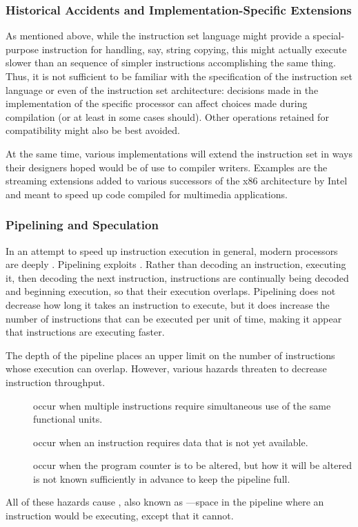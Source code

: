 \subsubsection{Historical Accidents and Implementation-Specific Extensions}
As mentioned above, while the instruction set language might provide a special-purpose instruction for handling, say, string copying, this might actually execute slower than an sequence of simpler instructions accomplishing the same thing. Thus, it is not sufficient to be familiar with the specification of the instruction set language or even of the instruction set architecture: decisions made in the implementation of the specific processor can affect choices made during compilation (or at least in some cases should). Other operations retained for compatibility might also be best avoided.

At the same time, various implementations will extend the instruction set in ways their designers hoped would be of use to compiler writers. Examples are the streaming  extensions added to various successors of the x86 architecture by Intel and  meant to speed up code compiled for multimedia applications.

\subsubsection{Pipelining and Speculation}
In an attempt to speed up instruction execution in general, modern processors are deeply . Pipelining exploits . Rather than decoding an instruction, executing it, then decoding the next instruction, instructions are continually being decoded and beginning execution, so that their execution overlaps. Pipelining does not decrease how long it takes an instruction to execute, but it does increase the number of instructions that can be executed per unit of time, making it appear that instructions are executing faster.

The depth of the pipeline places an upper limit on the number of instructions whose execution can overlap. However, various hazards threaten to decrease instruction throughput.
\begin{description}
\item[] occur when multiple instructions require simultaneous use of the same functional units.
\item[] occur when an instruction requires data that is not yet available.
\item[] occur when the program counter is to be altered, but how it will be altered is not known sufficiently in advance to keep the pipeline full.
\end{description}
All of these hazards cause , also known as ---space in the pipeline where an instruction would be executing, except that it cannot.

